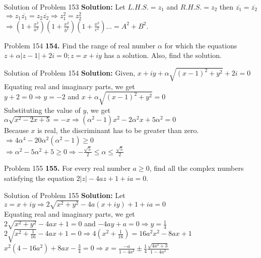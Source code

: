 \documentclass[aspectratio=169,8pt]{beamer}
\begin{document}
\begin{frame}{Solution of Problem 153}
  \textbf{Solution:} Let $L.H.S. = z_1$ and $R.H.S. = z_2$ then $\overline{z_1} = \overline{z_2}$\\
  \vspace*{0.2cm}
  $\Rightarrow z_1\overline{z_1} = z_2\overline{z_2} \Rightarrow z_1^2 = z_2^2$\\
  \vspace*{0.2cm}
  $\Rightarrow \left(1 + \frac{x^2}{a^2}\right)\left(1 + \frac{x^2}{b^2}\right)\left(1 + \frac{x^2}{c^2}\right)\ldots = A^2 + B^2$.
\end{frame}
\begin{frame}{Problem 154}
  \textbf{154.} Find the range of real number $\alpha$ for which the equations $z+\alpha|z−1|+2i=0;z=x+iy$ has a solution. Also,
  find the solution.
\end{frame}
\begin{frame}{Solution of Problem 154}
  \textbf{Solution:} Given, $x + iy + \alpha\sqrt{(x - 1)^2 + y^2} + 2i = 0$\\
  \vspace*{0.2cm}
  Equating real and imaginary parts, we get\\
  \vspace*{0.2cm}
  $y + 2 = 0 \Rightarrow y = -2$ and $x + \alpha\sqrt{(x - 1)^2 + y^2} = 0$\\
  \vspace*{0.2cm}
  Substituting the value of $y$, we get
  $\alpha\sqrt{x^2 - 2x + 5} = -x \Rightarrow (\alpha^2 - 1)x^2 - 2\alpha^2x +5\alpha^2 = 0$\\
  \vspace*{0.2cm}
  Because $x$ is real, the discriminant has to be greater than zero.
  \vspace*{0.2cm}
  $\Rightarrow 4\alpha^4 - 20\alpha^2(\alpha^2 - 1) \geq 0$\\
  \vspace*{0.2cm}
  $\Rightarrow \alpha^2 - 5\alpha^2 + 5 \geq 0 \Rightarrow -\frac{\sqrt{5}}{2}\leq\alpha\leq \frac{\sqrt{5}}{2}$
\end{frame}
\begin{frame}{Problem 155}
  \textbf{155.} For every real number $a\geq0$, find all the complex numbers satisfying the equation $2|z|−4az+1+ia=0$.
\end{frame}
\begin{frame}{Solution of Problem 155}
  \textbf{Solution:} Let $z = x + iy \Rightarrow 2\sqrt{x^2 + y^2} - 4a(x + iy) + 1 + ia = 0$\\
  \vspace*{0.2cm}
  Equating real and imaginary parts, we get\\
  \vspace*{0.2cm}
  $2\sqrt{x^2 + y^2} - 4ax + 1 = 0$ and $-4ay + a = 0 \Rightarrow y = \frac{1}{4}$\\
  \vspace*{0.2cm}
  $2\sqrt{x^2 + \frac{1}{16}} - 4ax + 1 = 0 \Rightarrow 4\left(x^2 + \frac{1}{16}\right) = 16a^2x^2 - 8ax + 1$\\
  \vspace*{0.2cm}
  $x^2(4 - 16a^2) + 8ax - \frac{3}{4} = 0 \Rightarrow x = \frac{-a}{1 - 4a^2} \pm \frac{1}{4}\frac{\sqrt{4a^2 + 3}}{1 - 4a^2}$
\end{frame}
\end{document}
